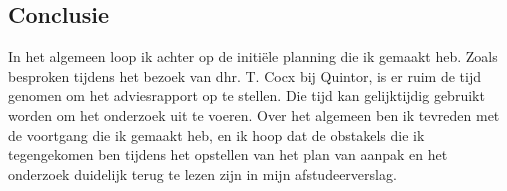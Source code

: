 \documentclass{report}
\begin{document}
\begin{multicols}{2}
        \subsection*{Conclusie}
        In het algemeen loop ik achter op de initiële planning die ik gemaakt heb. Zoals besproken tijdens het bezoek van dhr. T. Cocx bij Quintor, is er ruim de tijd genomen om het adviesrapport op te stellen. Die tijd kan gelijktijdig gebruikt worden om het onderzoek uit te voeren. Over het algemeen ben ik tevreden met de voortgang die ik gemaakt heb, en ik hoop dat de obstakels die ik tegengekomen ben tijdens het opstellen van het plan van aanpak en het onderzoek duidelijk terug te lezen zijn in mijn afstudeerverslag.
    \end{multicols}
\end{document}
